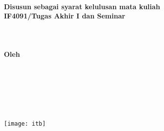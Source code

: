 \documentclass[../main/main.tex]{subfiles}
\begin{document}
\begin{titlepage}
\makeatletter
\begin{center}
\begin{spacing}{\double}
\judul{\@title}\\
\end{spacing}
~\\
~\\
\\
~\\
~\\
\textbf{Disusun sebagai syarat kelulusan mata kuliah\\IF4091/Tugas Akhir I dan Seminar}\\
~\\
~\\
~\\
\textbf{Oleh}\\
\begin{spacing}{\semidouble}
\judul{\@author}\\
\\
\end{spacing}
~\\
~\\
~\\
\texttt{[image: itb]}\\
~\\
~\\
~\\
\begin{spacing}{\semidouble}
\\
\\
\\
\subjudul{\Version}\\
\end{spacing}
\end{center}
\makeatother
\end{titlepage}
\end{document}
